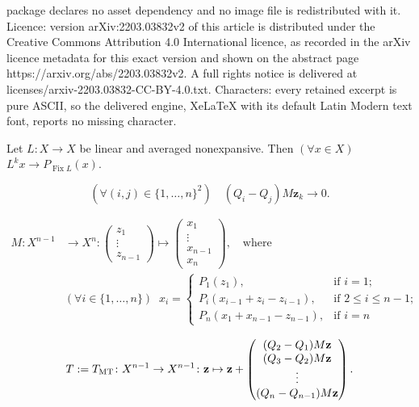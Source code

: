 \documentclass[10pt,a4paper]{amsart}
\newcommand{\Fix}{\ensuremath{\operatorname{Fix}}}
\newcommand{\bz}{\ensuremath{\mathbf{z}}}
\newcommand{\tmt}{\ensuremath{T_{\text{\scriptsize MT}}}}
\begin{document}
package declares no asset dependency and no image file is redistributed with it. Licence: version arXiv:2203.03832v2 of this article is distributed under the Creative Commons Attribution 4.0 International licence, as recorded in the arXiv licence metadata for this exact version and shown on the abstract page https://arxiv.org/abs/2203.03832v2. A full rights notice is delivered at licenses/arxiv-2203.03832-CC-BY-4.0.txt. Characters: every retained excerpt is pure ASCII, so the delivered engine, XeLaTeX with its default Latin Modern text font, reports no missing character.
\begin{corollary}
\label{c:key}
Let $L\colon X\to X$ be linear and averaged nonexpansive.
Then 
$(\forall x\in X)$ $L^kx \to P_{\Fix L}(x)$.
\end{corollary}

\begin{equation}
\label{e:210817a}
(\forall (i,j)\in\{1,\ldots,n\}^2)\quad 
(Q_i-Q_j)M\bz_k\to 0. 
\end{equation}

\begin{subequations}
\label{e:linMTM}
\begin{align}
M\colon X^{n-1}
&\to 
X^n\colon
\begin{pmatrix}
z_1\\
\vdots\\
z_{n-1}
\end{pmatrix}
\mapsto
\begin{pmatrix}
x_1\\
\vdots\\
x_{n-1}\\
x_n
\end{pmatrix},
\quad\text{where}\;\;
\\[+2mm]
&(\forall i\in\{1,\ldots,n\})
\;\;
x_i = \begin{cases}
P_{1}(z_1), &\text{if $i=1$;}\\
P_{i}(x_{i-1}+z_i-z_{i-1}), &\text{if $2\leq i\leq n-1$;}\\
P_{n}(x_1+x_{n-1}-z_{n -1}), &\text{if $i=n$}
\end{cases}
\end{align}
\end{subequations}

\begin{equation}
\label{e:linMT}
T := \tmt \colon X^{n-1}\to X^{n-1}\colon 
\bz\mapsto 
\bz+ 
\begin{pmatrix}
(Q_2-Q_1)M\bz\\
(Q_3-Q_2)M\bz\\
\vdots\\
(Q_n-Q_{n-1})M\bz
\end{pmatrix}. 
\end{equation}
\end{document}
